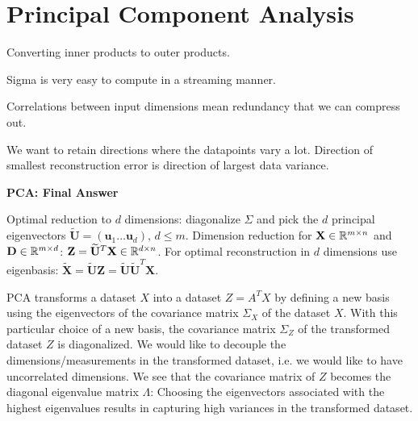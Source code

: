 \documentclass[12pt]{article}
\begin{document}
\section{Principal Component Analysis}
\ulb
\item Converting inner products to outer products.
\item Sigma is very easy to compute in a streaming manner.
\item Correlations between input dimensions mean redundancy that we can compress out.
\item We want to retain directions where the datapoints vary a lot. Direction of smallest reconstruction error is direction of largest data variance.
\ule
\par \textbf{PCA: Final Answer}
\par Optimal reduction to $d$ dimensions: diagonalize $\Sigma$ and pick the $d$ principal eigenvectors $\widetilde{\mathbf{U}} = (\mathbf{u}_1 \dots \mathbf{u}_d) \text{, } d\leq m$. Dimension reduction for $\mathbf{X}\in \mathbb{R}^{m\times n}$ and $\mathbf{D}\in \mathbb{R}^{m\times d}$: $\mathbf{Z} = \widetilde{\mathbf{U}}^T \mathbf{X} \in \mathbb{R}^{d\times n}$. For optimal reconstruction in $d$ dimensions use eigenbasis: $\widetilde{\mathbf{X}} = \widetilde{\mathbf{U}}\mathbf{Z} = \widetilde{\mathbf{U}}\widetilde{\mathbf{U}}^T\mathbf{X}$.\\
\par PCA transforms a dataset $X$ into a dataset $Z = A^TX$ by defining a new basis using the eigenvectors of the covariance matrix $\Sigma_X$ of the dataset $X$. With this particular choice of a new basis, the covariance matrix $\Sigma_Z$ of the transformed dataset $Z$ is diagonalized. We would like to decouple the dimensions/measurements in the transformed dataset, i.e. we would like to have uncorrelated dimensions. We see that the covariance matrix of $Z$ becomes the diagonal eigenvalue matrix $\Lambda$: Choosing the eigenvectors associated with the highest eigenvalues results in capturing high variances in the transformed dataset.
\end{document}
